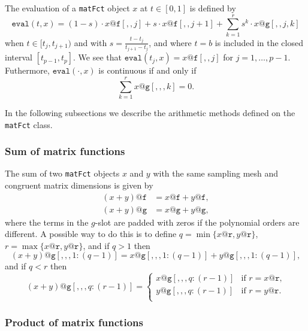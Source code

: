 \documentclass[12pt,a4paper]{article}
\begin{document}
The evaluation of a \texttt{matFct} object $x$ at $t \in [0,1]$ is defined by
\begin{equation} \label{eq:eval}
\texttt{eval}(t,x) = (1-s) \cdot x@\texttt{f}[,,j] + s \cdot x@\texttt{f}[,,j+1] + \sum_{k=1}^r s^k \cdot x@\texttt{g}[,,j,k]
\end{equation}
when $t \in [t_j,t_{j+1})$ and with $s = \frac{t-t_j}{t_{j+1}-t_j}$, and where $t=b$ is included in the closed interval $[t_{p-1},t_p]$. We see that $\texttt{eval}(t_j,x) = x@\texttt{f}[,,j]$ for $j=1,\dotsc,p-1$. Futhermore, $\texttt{eval}(\cdot,x)$ is continuous if and only if
\begin{equation*}
\sum_{k=1}^r x@\texttt{g}[,,,k] = 0.
\end{equation*}

In the following subsections we describe the arithmetic methods defined on the \texttt{matFct} class.

\subsubsection{Sum of matrix functions} 

The sum of two \texttt{matFct} objects $x$ and $y$ with the same sampling mesh and congruent matrix dimensions is given by
\begin{align*}
(x+y)@\texttt{f} &= x@\texttt{f} + y@\texttt{f}, \\
(x+y)@\texttt{g} &= x@\texttt{g} + y@\texttt{g},
\end{align*}
where the terms in the $g$-slot are padded with zeros if the polynomial orders are different. A possible way to do this is to define 
$q = \min\{ x@\texttt{r}, y@\texttt{r} \}$, $r = \max\{ x@\texttt{r}, y@\texttt{r} \}$, and if $q > 1$ then
\begin{equation*}
(x+y)@\texttt{g}[,,,1:(q-1)] = 
x@\texttt{g}[,,,1:(q-1)] + y@\texttt{g}[,,,1:(q-1)],
\end{equation*}
and if $q < r$ then
\begin{equation*}
(x+y)@\texttt{g}[,,,q:(r-1)] =
\begin{cases}
x@\texttt{g}[,,,q:(r-1)] & \text{if $r = x@\texttt{r}$,} \\
y@\texttt{g}[,,,q:(r-1)] & \text{if $r = y@\texttt{r}$.} \\
\end{cases}
\end{equation*}

\subsubsection{Product of matrix functions}
\end{document}
